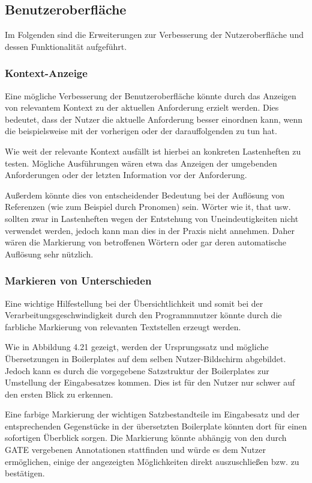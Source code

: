 \documentclass[12pt]{report}
\begin{document}
\subsection{Benutzeroberfläche}
Im Folgenden sind die Erweiterungen zur Verbesserung der Nutzeroberfläche und dessen Funktionalität aufgeführt. 

\subsubsection{Kontext-Anzeige}
Eine mögliche Verbesserung der Benutzeroberfläche könnte durch das Anzeigen von relevantem Kontext zu der aktuellen Anforderung erzielt werden. Dies bedeutet, dass der Nutzer die aktuelle Anforderung besser einordnen kann, wenn die beispielsweise mit der vorherigen oder der darauffolgenden zu tun hat. 

Wie weit der relevante Kontext ausfällt ist hierbei an konkreten Lastenheften zu testen. Mögliche Ausführungen wären etwa das Anzeigen der umgebenden Anforderungen oder der letzten Information vor der Anforderung.  

Außerdem könnte dies von entscheidender Bedeutung bei der Auflösung von Referenzen (wie zum Beispiel durch Pronomen) sein. Wörter wie \glqq it\grqq{}, \glqq that\grqq{} usw. sollten zwar in Lastenheften wegen der Entstehung von Uneindeutigkeiten nicht verwendet werden, jedoch kann man dies in der Praxis nicht annehmen. Daher wären die Markierung von betroffenen Wörtern oder gar deren automatische Auflösung sehr nützlich.

\subsubsection{Markieren von Unterschieden}
Eine wichtige Hilfestellung bei der Übersichtlichkeit und somit bei der Verarbeitungsgeschwindigkeit durch den Programmnutzer könnte durch die farbliche Markierung von relevanten Textstellen erzeugt werden.
 
Wie in Abbildung 4.21 gezeigt, werden der Ursprungssatz und mögliche Übersetzungen in Boilerplates auf dem selben Nutzer-Bildschirm abgebildet. Jedoch kann es durch die vorgegebene Satzstruktur der Boilerplates zur Umstellung der Eingabesatzes kommen. Dies ist für den Nutzer nur schwer auf den ersten Blick zu erkennen.

Eine farbige Markierung der wichtigen Satzbestandteile im Eingabesatz und der entsprechenden Gegenstücke in der übersetzten Boilerplate könnten dort für einen sofortigen Überblick sorgen. Die Markierung könnte abhängig von den durch GATE vergebenen Annotationen stattfinden und würde es dem Nutzer ermöglichen, einige der angezeigten Möglichkeiten direkt auszuschließen bzw. zu bestätigen.
\end{document}
